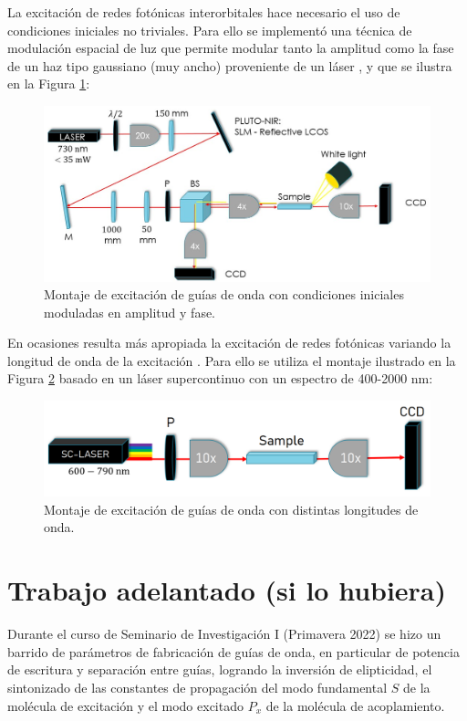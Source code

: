\documentclass{article}
\begin{document}
La excitación de redes fotónicas interorbitales hace necesario el uso de condiciones iniciales no triviales. Para ello se implementó una técnica de modulación espacial de luz que permite modular tanto la amplitud como la fase de un haz tipo gaussiano (muy ancho) proveniente de un láser \cite{slm}, y que se ilustra en la Figura \ref{fig:SLM}:

\begin{figure}[H]
	\centering
	\includegraphics[width=0.9\linewidth]{./media/SLMsetup.png}
	\caption{Montaje de excitación de guías de onda con condiciones iniciales moduladas en amplitud y fase.\label{fig:SLM}}
\end{figure}

En ocasiones resulta más apropiada la excitación de redes fotónicas variando la longitud de onda de la excitación \cite{spectraltransfer, SPSSH}. Para ello se utiliza el montaje ilustrado en la Figura \ref{fig:supercontinuum} basado en un láser supercontinuo con un espectro de 400-2000 nm:

\begin{figure}[H]
	\centering
	\includegraphics[width=0.7\linewidth]{./media/supercontinuum.png}
	\caption{Montaje de excitación de guías de onda con distintas longitudes de onda.\label{fig:supercontinuum}}
\end{figure}


\section{Trabajo adelantado (si lo hubiera)}

Durante el curso de Seminario de Investigación I (Primavera 2022) se hizo un barrido de parámetros de fabricación de guías de onda, en particular de potencia de escritura y separación entre guías, logrando la inversión de elipticidad, el sintonizado de las constantes de propagación del modo fundamental $S$ de la molécula de excitación y el modo excitado $P_x$ de la molécula de acoplamiento.
\end{document}
